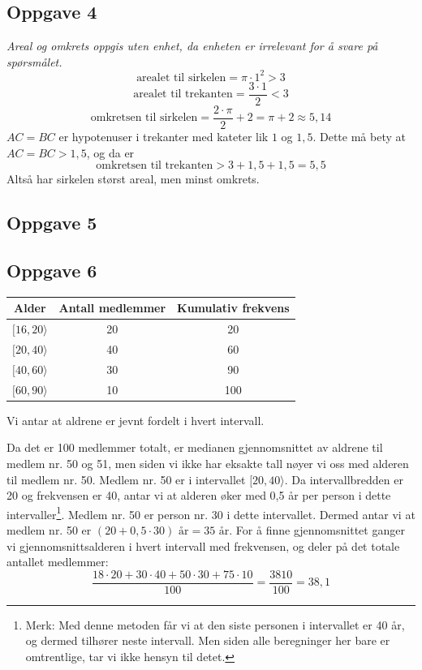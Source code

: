 \subsection*{Oppgave 4}
\textit{Areal og omkrets oppgis uten enhet, da enheten er irrelevant for å svare på spørsmålet.}
\[ \text{arealet til sirkelen}=\pi\cdot1^2>3 \]
\[ \text{arealet til trekanten}=\frac{3\cdot1}{2}<3 \]
\[ \text{omkretsen til sirkelen}=\frac{2\cdot\pi}{2}+2=\pi +2\approx5,14 \]
$AC=BC$ er hypotenuser i trekanter med kateter lik $1$ og $1,5$. Dette må bety at $AC=BC>1,5$, og da er
\[ \text{omkretsen til trekanten}> 3+1,5+1,5=5,5 \]
Altså har sirkelen størst areal, men minst omkrets.

\subsection*{Oppgave 5}

\subsection*{Oppgave 6}
\begin{center}
	\begin{tabular}{c | c | c}
		\textbf{Alder} & \textbf{Antall medlemmer} & \textbf{Kumulativ frekvens}\\ \hline
		$[16, 20\rangle$ & 20 & 20 \\ \hline
		$[20, 40\rangle$ & 40 & 60 \\ \hline
		$[40, 60\rangle$ & 30 & 90 \\ \hline
		$[60, 90\rangle$ & 10 & 100 \\ \hline
	\end{tabular}
\end{center}
Vi antar at aldrene er jevnt fordelt i hvert intervall. \os

Da det er 100 medlemmer totalt, er medianen gjennomsnittet av aldrene til medlem nr. 50 og 51, men siden vi ikke har eksakte tall nøyer vi oss med alderen til medlem nr. 50. Medlem nr. 50 er i intervallet $[20, 40\rangle$. Da intervallbredden er 20 og frekvensen er 40, antar vi at alderen øker med 0,5 år per person i dette intervaller\footnote{Merk: Med denne metoden får vi at den siste personen i intervallet er 40 år, og dermed tilhører neste intervall. Men siden alle beregninger her bare er omtrentlige, tar vi ikke hensyn til detet.}. Medlem nr. 50 er person nr. 30 i dette intervallet. Dermed antar vi at medlem nr. 50 er $(20+0,5\cdot30)\text{ år}=35\text{ år}$.\os
For å finne gjennomsnittet ganger vi gjennomsnittsalderen i hvert intervall med frekvensen, og deler på det totale antallet medlemmer:
\[ \frac{18\cdot20+30\cdot40+50\cdot30+75\cdot10}{100}=\frac{3810}{100}=38,1 \]

